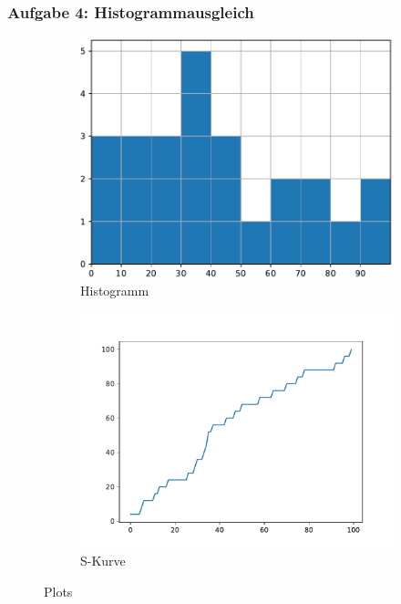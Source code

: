\documentclass[accentcolor=tud1a,colorbacktitle,inverttitle,landscape,german,presentation,t]{tudbeamer}
\begin{document}
	\begin{frame}[t]
		\frametitle{Aufgabe 4: Histogrammausgleich}
		\begin{figure}	
			\centering
			\begin{subfigure}[t]{.45\textwidth}
				\centering
				\includegraphics[width=\textwidth]{fig/histogram.pdf}
				\caption{Histogramm}\label{fig:1a}		
			\end{subfigure}
			\quad
			\begin{subfigure}[t]{.45\textwidth}
				\centering
				\includegraphics[width=\textwidth]{fig/s-curve.pdf}
				\caption{S-Kurve}\label{fig:1b}
			\end{subfigure}
			\caption{Plots}\label{fig:1}
		\end{figure}
	\end{frame}
\end{document}
